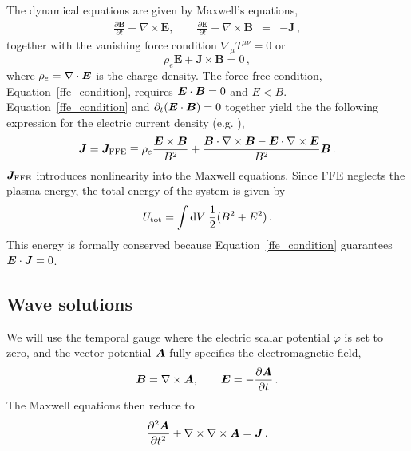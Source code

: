 The dynamical equations are given by Maxwell's equations,
%
\begin{eqnarray}\label{eq:Maxwell}
	\frac{\partial\boldsymbol{B}}{\partial t}+\nabla\times \boldsymbol{E},
    \qquad
	\frac{\partial\boldsymbol{E}}{\partial t}-\nabla\times \boldsymbol{B} &=& -\boldsymbol{J} \, ,
\end{eqnarray}
%
together with 
the vanishing force condition $\nabla_\mu T^{\mu\nu}=0$ or
%
\begin{equation}\label{ffe_condition}
	\rho_e \boldsymbol{E}+\boldsymbol{J}\times \boldsymbol{B} = 0 \, ,
\end{equation}
%
where $\rho_e=\nabla\cdot\boldsymbol{E}$ is the charge density. The force-free condition, Equation~\ref{ffe_condition}, requires $\boldsymbol{E} \cdot \boldsymbol{B} = 0$ and $E < B$.
Equation~\ref{ffe_condition} and $\partial_t(\boldsymbol{E} \cdot \boldsymbol{B}) = 0$ together yield the the following expression for the electric current density (e.g. \citet{2002MNRAS.336..759K}),
%
\begin{equation}\label{current}
	\boldsymbol{J}=\boldsymbol{J}_{\rm FFE} \equiv \rho_e \frac{\boldsymbol{E}\times\boldsymbol{B}}{B^2}+\frac{\boldsymbol{B}\cdot\nabla\times\boldsymbol{B}-\boldsymbol{E}\cdot\nabla\times\boldsymbol{E}}{B^2}\boldsymbol{B} \, .
\end{equation}
%
$\boldsymbol{J}_{\rm FFE}$ introduces nonlinearity into the Maxwell equations.
Since FFE neglects the plasma energy, the total energy of the system is given by
%
\begin{equation}
	U_{\rm tot} = \int\mathrm{d} V\;\frac{1}{2}(B^2+E^2) \, .
\end{equation}
%
This energy is formally conserved because Equation~\ref{ffe_condition} guarantees $\boldsymbol{E} \cdot \boldsymbol{J} = 0$.

\subsection{Wave solutions}
%
We will use the temporal gauge where the electric scalar potential $\varphi$ is set to zero, and the vector potential $\boldsymbol{A}$ fully specifies the electromagnetic field,
%
\begin{eqnarray}\label{potential}
	\boldsymbol{B} = \nabla\times \boldsymbol{A}, \qquad \boldsymbol{E} = - \frac{\partial \boldsymbol{A}}{\partial t} \, .
\end{eqnarray}
%
The Maxwell equations then reduce to 
%
\begin{equation}\label{reducedMax}
	\frac{\partial^2\boldsymbol{A}}{\partial t^2} + \nabla\times \nabla\times\boldsymbol{A} = \boldsymbol{J} \, .
\end{equation}
%

